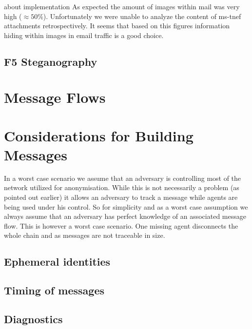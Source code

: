                      about implementation 
As expected the amount of images within mail was very high ($\approx 50\%$). Unfortunately we were unable to analyze the content of ms-tnef attachments retrospectively. It seems that based on this figures information hiding within images in email traffic is a good choice.

\subsection{F5 Steganography}


\section{Message Flows}


\section{Considerations for Building Messages}
In a worst case scenario we assume that an adversary is controlling most of the network utilized for anonymisation. While this is not necessarily a problem (as pointed out earlier) it allows an adversary to track a message while agents are being used under his control. So for simplicity and as a worst case assumption we always assume that an adversary has perfect knowledge of an associated message flow. This is however a worst case scenario. One missing agent disconnects the whole chain and as messages are not traceable in size.


\subsection{Ephemeral identities}

\subsection{Timing of messages}

\subsection{Diagnostics}

